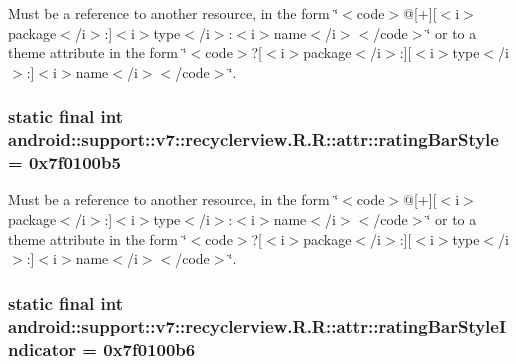 Must be a reference to another resource, in the form \char`\"{}$<$code$>$@\mbox{[}+\mbox{]}\mbox{[}$<$i$>$package$<$/i$>$:\mbox{]}$<$i$>$type$<$/i$>$:$<$i$>$name$<$/i$>$$<$/code$>$\char`\"{} or to a theme attribute in the form \char`\"{}$<$code$>$?\mbox{[}$<$i$>$package$<$/i$>$:\mbox{]}\mbox{[}$<$i$>$type$<$/i$>$:\mbox{]}$<$i$>$name$<$/i$>$$<$/code$>$\char`\"{}. \hypertarget{classandroid_1_1support_1_1v7_1_1recyclerview_1_1_r_1_1attr_6b2f1b90c991287690472c620c2a8e02}{
\subsubsection[{ratingBarStyle}]{\setlength{\rightskip}{0pt plus 5cm}static final int android::support::v7::recyclerview.R.R::attr::ratingBarStyle = 0x7f0100b5}}
\label{classandroid_1_1support_1_1v7_1_1recyclerview_1_1_r_1_1attr_6b2f1b90c991287690472c620c2a8e02}


Must be a reference to another resource, in the form \char`\"{}$<$code$>$@\mbox{[}+\mbox{]}\mbox{[}$<$i$>$package$<$/i$>$:\mbox{]}$<$i$>$type$<$/i$>$:$<$i$>$name$<$/i$>$$<$/code$>$\char`\"{} or to a theme attribute in the form \char`\"{}$<$code$>$?\mbox{[}$<$i$>$package$<$/i$>$:\mbox{]}\mbox{[}$<$i$>$type$<$/i$>$:\mbox{]}$<$i$>$name$<$/i$>$$<$/code$>$\char`\"{}. \hypertarget{classandroid_1_1support_1_1v7_1_1recyclerview_1_1_r_1_1attr_d6ea89f5bed3179e330ef23e27bcac62}{
\subsubsection[{ratingBarStyleIndicator}]{\setlength{\rightskip}{0pt plus 5cm}static final int android::support::v7::recyclerview.R.R::attr::ratingBarStyleIndicator = 0x7f0100b6}}
\label{classandroid_1_1support_1_1v7_1_1recyclerview_1_1_r_1_1attr_d6ea89f5bed3179e330ef23e27bcac62}


